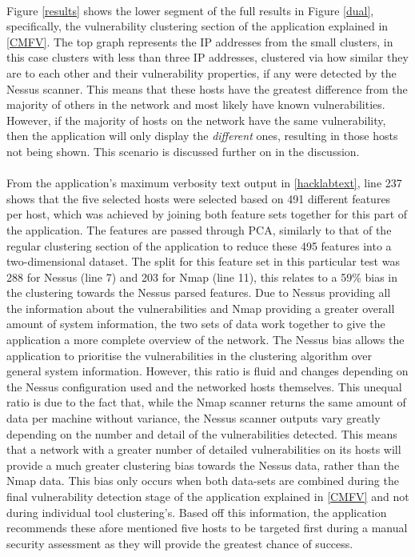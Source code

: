\paragraph{}Figure \ref{results} shows the lower segment of the full results in Figure \ref{dual}, specifically, the vulnerability clustering section of the application explained in \ref{CMFV}. The top graph represents the IP addresses from the small clusters, in this case clusters with less than three IP addresses, clustered via how similar they are to each other and their vulnerability properties, if any were detected by the Nessus scanner. This means that these hosts have the greatest difference from the majority of others in the network and most likely have known vulnerabilities. However, if the majority of hosts on the network have the same vulnerability, then the application will only display the \textit{different} ones, resulting in those hosts not being shown. This scenario is discussed further on in the discussion. 

\paragraph{}From the application's maximum verbosity text output in \ref{hacklabtext}, line 237 shows that the five selected hosts were selected based on 491 different features per host, which was achieved by joining both feature sets together for this part of the application. The features are passed through PCA, similarly to that of the regular clustering section of the application to reduce these 495 features into a two-dimensional dataset. The split for this feature set in this particular test was 288 for Nessus (line 7) and 203 for Nmap (line 11), this relates to a 59\% bias in the clustering towards the Nessus parsed features. Due to Nessus providing all the information about the vulnerabilities and Nmap providing a greater overall amount of system information, the two sets of data work together to give the application a more complete overview of the network. The Nessus bias allows the application to prioritise the vulnerabilities in the clustering algorithm over general system information. However, this ratio is fluid and changes depending on the Nessus configuration used and the networked hosts themselves. This unequal ratio is due to the fact that, while the Nmap scanner returns the same amount of data per machine without variance, the Nessus scanner outputs vary greatly depending on the number and detail of the vulnerabilities detected. This means that a network with a greater number of detailed vulnerabilities on its hosts will provide a much greater clustering bias towards the Nessus data, rather than the Nmap data. This bias only occurs when both data-sets are combined during the final vulnerability detection stage of the application explained in \ref{CMFV} and not during individual tool clustering's. Based off this information, the application recommends these afore mentioned five hosts to be targeted first during a manual security assessment as they will provide the greatest chance of success.

